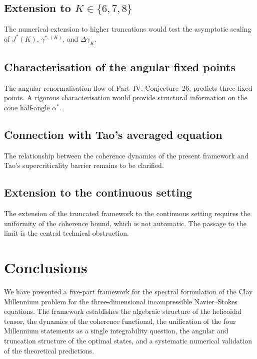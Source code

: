 \subsection{Extension to $K\in\{6,7,8\}$}
\label{part-5:ssec:open-K}

The numerical extension to higher truncations would test the 
asymptotic scaling of $J^\ast(K)$, $\gamma^{\ast,(K)}$, and 
$\Delta\gamma_K$.

\subsection{Characterisation of the angular fixed points}
\label{part-5:ssec:open-angular}

The angular renormalisation flow of Part~IV, Conjecture~26, predicts 
three fixed points. A rigorous characterisation would provide 
structural information on the cone half-angle $\alpha^\ast$.

\subsection{Connection with Tao's averaged equation}
\label{part-5:ssec:open-Tao}

The relationship between the coherence dynamics of the present 
framework and Tao's supercriticality barrier remains to be 
clarified.

\subsection{Extension to the continuous setting}
\label{part-5:ssec:open-continuous}

The extension of the truncated framework to the continuous setting 
requires the uniformity of the coherence bound, which is not 
automatic. The passage to the limit is the central technical 
obstruction.

\section{Conclusions}
\label{part-5:sec:conclusions-V}

We have presented a five-part framework for the spectral formulation 
of the Clay Millennium problem for the three-dimensional 
incompressible Navier--Stokes equations. The framework establishes 
the algebraic structure of the helicoidal tensor, the dynamics of 
the coherence functional, the unification of the four Millennium 
statements as a single integrability question, the angular and 
truncation structure of the optimal states, and a systematic 
numerical validation of the theoretical predictions.


